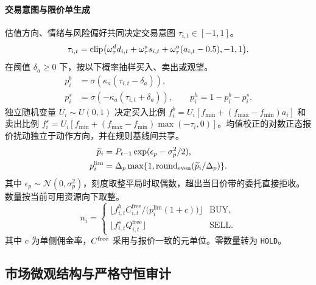 \paragraph{交易意图与限价单生成} 估值方向、情绪与风险偏好共同决定交易意图 $\tau_{i,t}\in[-1,1]$。
\begin{equation}
\tau_{i,t}=\operatorname{clip}\bigl(\omega_\tau^d d_{i,t}+\omega_\tau^s s_{i,t}+\omega_\tau^a(a_{i,t}-0.5),-1,1\bigr).
  \label{eq:intent_score_zh}
\end{equation}
在阈值 $\delta_a\ge0$ 下，按以下概率抽样买入、卖出或观望。
\begin{equation}
\begin{split}p_i^b&=\sigma(\kappa_a(\tau_{i,t}-\delta_a)),\\p_i^s&=\sigma(-\kappa_a(\tau_{i,t}+\delta_a)),\qquad p_i^h=1-p_i^b-p_i^s.\end{split}
  \label{eq:action_selection_zh}
\end{equation}
独立随机变量 $U_i\sim U(0,1)$ 决定买入比例 $f_i^b=U_i[f_{\min}+(f_{\max}-f_{\min})a_i]$ 和卖出比例 $f_i^s=U_i[f_{\min}+(f_{\max}-f_{\min})\max(-\tau_i,0)]$。均值校正的对数正态报价扰动独立于动作方向，并在规则基线间共享。
\begin{equation}
\begin{split}\widetilde p_i&=P_{t-1}\exp(\epsilon_p-\sigma_p^2/2),\\p_i^{\rm lim}&=\Delta_p\max\{1,\operatorname{round}_{\rm even}(\widetilde p_i/\Delta_p)\}.\end{split}
  \label{eq:limit_price_zh}
\end{equation}
其中 $\epsilon_p\sim\mathcal N(0,\sigma_p^2)$，刻度取整平局时取偶数，超出当日价带的委托直接拒收。数量按当前可用资源向下取整。
\begin{equation}
  n_i = \begin{cases}
    \bigl\lfloor f^b_{i,t} C_{i,t}^{\mathrm{free}} / \bigl(p_i^{\mathrm{lim}}(1+c)\bigr) \bigr\rfloor & \mathrm{BUY}, \\
    \bigl\lfloor f^s_{i,t} Q_{i,t}^{\mathrm{free}} \bigr\rfloor & \mathrm{SELL}.
  \end{cases}
  \label{eq:order_quantity_zh}
\end{equation}
其中 $c$ 为单侧佣金率，$C^{\rm free}$ 采用与报价一致的元单位。零数量转为 \texttt{HOLD}。

\subsection{市场微观结构与严格守恒审计}
\label{sec:method:microstructure_zh}

